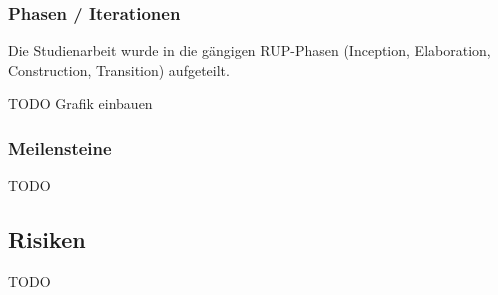 \subsubsection{Phasen / Iterationen}
\label{sub:Phasen / Iterationen}

Die Studienarbeit wurde in die gängigen \acs{RUP}-Phasen (Inception, Elaboration, Construction, Transition) aufgeteilt. 

TODO Grafik einbauen

\subsubsection{Meilensteine}
\label{sub:Meilensteine}

TODO

\subsection{Risiken}
\label{sub:Risiken}

TODO